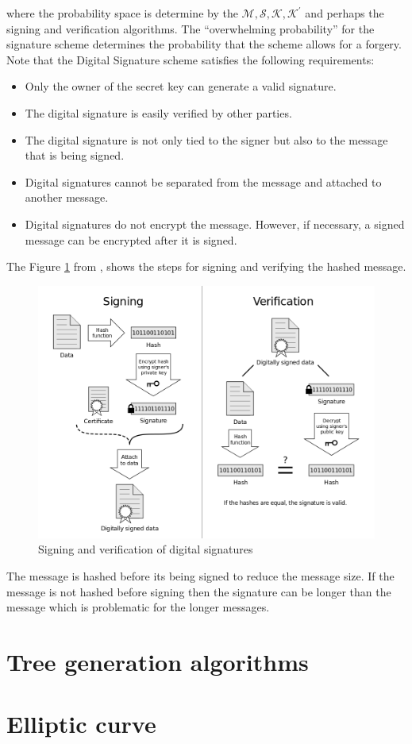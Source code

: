 	where the probability space is determine by the $\mathcal {M, S, K, K^{'}}$ and perhaps the signing and verification algorithms.
	The ``overwhelming probability'' for the signature scheme determines the probability that the scheme allows for a forgery.
	Note that the Digital Signature scheme satisfies the following requirements:
		\begin{itemize}
			\item Only the owner of the secret key can generate a valid signature.
			\item The digital signature is easily verified by other parties.
			\item The digital signature is not only tied to the signer but also to the message that is being signed.
			\item Digital signatures cannot be separated from the message and attached to another message.
			\item Digital signatures do not encrypt the message. However, if necessary, a signed message can be encrypted after it is signed.
		\end{itemize}
	The Figure \ref{fig:digita-signature} from \cite{DigitalSignature}, shows the steps for signing and verifying the hashed message. 
	\begin{figure}[h!]
		\centering
		\includegraphics[scale = 0.4]{images/Digital_Signature_diagram.png}
		\caption{ Signing and verification of digital signatures}
		\label{fig:digita-signature}
	\end{figure}
	The message is hashed before its being signed to reduce the message size. 
	If the message is not hashed before signing then the signature can be longer than the message which is problematic for the longer messages.

\section {Tree generation algorithms}


\section{Elliptic curve}